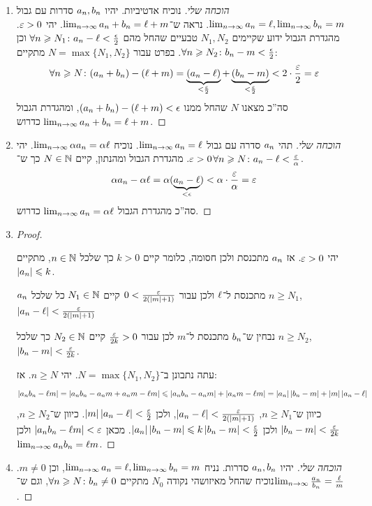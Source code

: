 \documentclass[name=רשימות חשבון דיפרנציאלי ואינטגרלי 1א]{../../../tex/classes/megasumPreamble}
\begin{document}
	\begin{enumerate}
		\item \begin{proof}[הוכחה שלי]
			נוכיח אדטיביות. יהיו $a_n, b_n$ סדרות עם גבול $\lim_{n \to \infty} a_n = \ell, \lim_{n \to \infty} b_n = m$. נראה ש־$\lim_{n \to \infty} a_n + b_n = \ell + m$. יהי $\eg > 0$. מהגדרת הגבול ידוע שקיימים $N_1, N_2$ טבעיים שהחל מהם $\forall n \geqslant N_1 \colon a_n - \ell < \frac{\epsilon}{2}$ וכן $\forall n \geqslant N_2 \colon b_n - m < \frac{\epsilon}{2}$. בפרט עבור $N = \max\{N_1, N_2\}$ מתקיים:
			\[ \forall n \ge N \co (a_n + b_n) - (\ml + m) = \underbrace{(a_n - \ml)}_{< \frac{\eg}{2}} + \underbrace{(b_n - m)}_{< \frac{\eg}{2}} < 2 \cdot \frac{\eg}{2} = \eg \]
			סה''כ מצאנו $N$ שהחל ממנו $(a_n + b_n) - (\ell + m) < \epsilon$, ומהגדרת הגבול $\lim_{n \to \infty} a_n + b_n = \ell + m$ כדרוש.
		\end{proof}
		\item \begin{proof}[הוכחה שלי]
			תהי $a_n$ סדרה עם גבול $\lim_{n \to \infty} a_n = \ell$. נוכיח $\lim_{n \to \infty} \alpha a_n = \alpha \ell$. יהי $\eg > 0$. מהגדרת הגבול ומהנתון, קיים $N\in \mathbb{N}$ כך ש־$\forall n \ge N \co a_n - \ml < \frac{\eg}{\ag}$.
			\[ \ag a_n - \ag\ml = \ag(\underbrace{a_n - \ml}_{< \epsi}) < \ag \cdot \frac{\eg}{\ag} = \eg \]
			סה''כ מהגדרת הגבול $\lim_{n \to \infty} a_n = \alpha \ell$ כדרוש.
		\end{proof}
		\item \begin{proof}\,\![טיוטה: $\sof{a_n b_n - \ml m} = \sof{a_n b_n - a_n m + a_n m - \ml m} \le \sof{a_n b_n - a_n m} + \sof{a_n m - \ml m} = \sof{a_n}\sof{b_n - m} + \sof{m}\sof{a_n - \ml}$ ואז נקבל $\sof{a_n - \ml} < \frac{\eg}{2(\sof{m} + 1)}$, ולגבול השני נבחר חסם בהתאם לגבול]

			יהי $\eg > 0$. אז $a_n$ מתכנסת ולכן חסומה, כלומר קיים $k > 0$ כך שלכל $n \in \mathbb{N}$, מתקיים $\left \lvert a_n \right \rvert \leqslant k$.

			$a_n$ מתכנסת ל־$\ell$ ולכן עבור $0 < \frac{\eg}{2(\sof{m} + 1)}$ קיים $N_1 \in \mathbb{N}$ כל שלכל $n \ge N_1$, $\sof{a_n - \ml} < \frac{\eg}{2(\sof{m} + 1)}$

			נבחין ש־$b_n$  מתכנסת ל־$m$ לכן עבור $\frac{\eg}{2k} > 0$ קיים $N_2 \in \mathbb{N}$ כך שלכל $n \ge N_2$, $\sof{b_n - m} < \frac{\eg}{2k}$.

			עתה נתבונן ב־$N = \max\{N_1, N_2\}$. יהי $n \ge N$. אז:
			\[ \left \lvert a_n b_n - \ell m \right \rvert = \left \lvert a_n b_n - a_n m + a_n m - \ell m \right \rvert  \leqslant \left \lvert a_n b_n - a_n m \right \rvert + \left \lvert a_n m - \ell m \right \rvert = \left \lvert a_n \right \rvert\left \lvert b_n - m \right \rvert + \left \lvert m \right \rvert \left \lvert a_n - \ell \right \rvert \]
			כיוון ש־$n \ge N_1$, $\sof{a_n - \ml} < \frac{\eg}{2(\sof{m} + 1)}$, ולכן $\sof{m}\sof{a_n - \ml} < \frac{\eg}{2}$. כיוון ש־$n \ge N_2$, $\sof{b_n - m} < \frac{\eg}{2k}$ ולכן $\sof{a_n}\sof{b_n - m} \le k\sof{b_n - m} < \frac{\eg}{2}$. מכאן $\sof{a_n b_n - \ml m} < \eg$ ולכן $\lim_{n \to \infty} a_n b_n = \ell m$.
		\end{proof}
		\item \begin{proof}[הוכחה שלי]
			יהיו $a_n, b_n$ סדרות. נניח $\lim_{n \to \infty} a_n = \ell, \lim_{n \to \infty} b_n = m$, וכן $m \neq 0$. נוכיח שהחל מאיזושהי נקודה $N_0$ מתקיים $\forall n \geqslant N \colon b_n \neq 0$, וגם ש־$\lim_{n \to \infty} \frac{a_n}{b_n} = \frac{\ell}{m}$.


\end{proof}
\end{enumerate}
\end{document}
